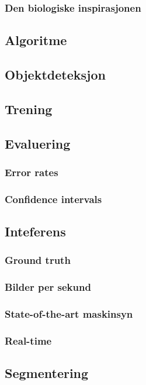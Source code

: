 \subsubsection{Den biologiske inspirasjonen}
\subsection{Algoritme}
\subsection{Objektdeteksjon}
\subsection{Trening}
\subsection{Evaluering}
\subsubsection{Error rates}
\subsubsection{Confidence intervals}
\subsection{Inteferens}
\subsubsection{Ground truth} %
\subsubsection{Bilder per sekund} %
\subsubsection{State-of-the-art maskinsyn} %
\subsubsection{Real-time} %
\subsection{Segmentering}

